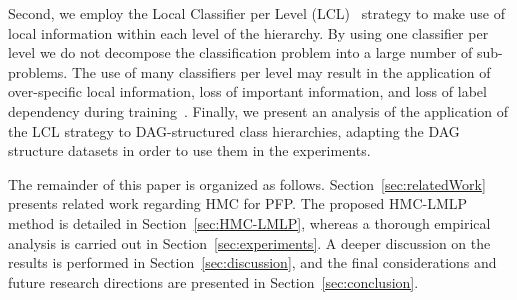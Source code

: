 Second, we employ the Local Classifier per Level (LCL)~\cite{Silla2010} strategy to make use of local information within each level of the hierarchy. By using one classifier per level we do not decompose the classification problem into a large number of sub-problems. The use of many classifiers per level may result in the application of over-specific local information, loss of important information, and loss of label dependency during training~\cite{Silla2010}. Finally, we present an analysis of the application of the LCL strategy to DAG-structured class hierarchies, adapting the DAG structure datasets in order to use them in the experiments. %


The remainder of this paper is organized as follows. Section~\ref{sec:relatedWork} presents related work regarding HMC for PFP. The proposed HMC-LMLP method is detailed in Section~\ref{sec:HMC-LMLP}, whereas a thorough empirical analysis is carried out in Section~\ref{sec:experiments}. A deeper discussion on the results is performed in Section~\ref{sec:discussion}, and the final considerations and future research directions are presented in Section~\ref{sec:conclusion}.

